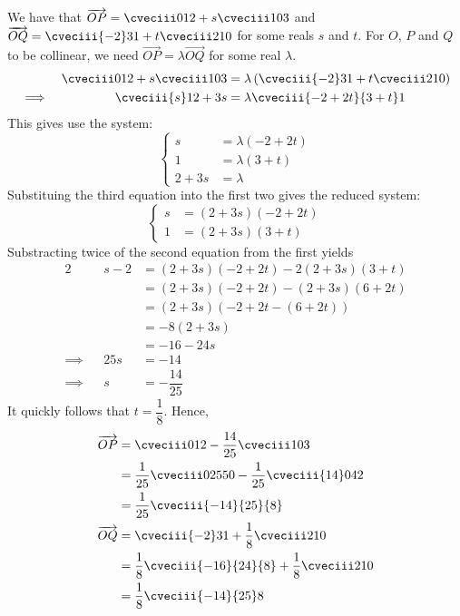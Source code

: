 \documentclass{jhwhw}
\begin{document}
    \solution
        We have that $\overrightarrow{OP} = \cveciii012 + s\cveciii103$ and $\overrightarrow{OQ} = \cveciii{-2}31 + t\cveciii210$ for some reals $s$ and $t$. For $O$, $P$ and $Q$ to be collinear, we need $\overrightarrow{OP} = \lambda \overrightarrow{OQ}$ for some real $\lambda$.
        \begin{alignat*}{2}
            &&\cveciii012 + s\cveciii103 &= \lambda\left(\cveciii{-2}31 + t\cveciii210\right)\\
            \implies&&\cveciii{s}1{2 + 3s} &= \lambda\cveciii{-2+2t}{3+t}1
        \end{alignat*}
        This gives use the system:
        \begin{equation*}
            \begin{cases}
                s &= \lambda (-2 + 2t)\\
                1 &= \lambda(3 + t)\\
                2 + 3s &= \lambda 
            \end{cases}
        \end{equation*}
        Substituing the third equation into the first two gives the reduced system:
        \begin{equation*}
            \begin{cases}
                s &= (2+3s)(-2+2t)\\
                1 &= (2+3s)(3+t)
            \end{cases}
        \end{equation*}
        Substracting twice of the second equation from the first yields
        \begin{alignat*}{2}
            &&s - 2 &= (2+3s)(-2+2t) - 2(2+3s)(3+t)\\
            && &= (2+3s)(-2+2t) - (2+3s)(6+2t)\\
            && &= (2+3s)(-2+2t - (6+2t))\\
            && &= -8(2+3s)\\
            && &= -16 - 24s\\
            \implies&&25s &= -14\\
            \implies&&s &= -\dfrac{14}{25}
        \end{alignat*}
        It quickly follows that $t = \dfrac18$. Hence,
        \begin{align*}
            \overrightarrow{OP} &= \cveciii012 - \dfrac{14}{25}\cveciii103\\
            &= \dfrac1{25}\cveciii0{25}{50} - \dfrac1{25}\cveciii{14}0{42}\\
            &= \dfrac1{25}\cveciii{-14}{25}{8}\\
            \overrightarrow{OQ} &= \cveciii{-2}31 + \dfrac18\cveciii210\\
            &= \dfrac18 \cveciii{-16}{24}{8} + \dfrac18 \cveciii210\\
            &= \dfrac18 \cveciii{-14}{25}8
        \end{align*}
\end{document}

